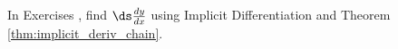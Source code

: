 {\noindent In Exercises} 
{,  find $\ds \frac{dy}{dx}$ using Implicit Differentiation and Theorem \ref{thm:implicit_deriv_chain}.
}
